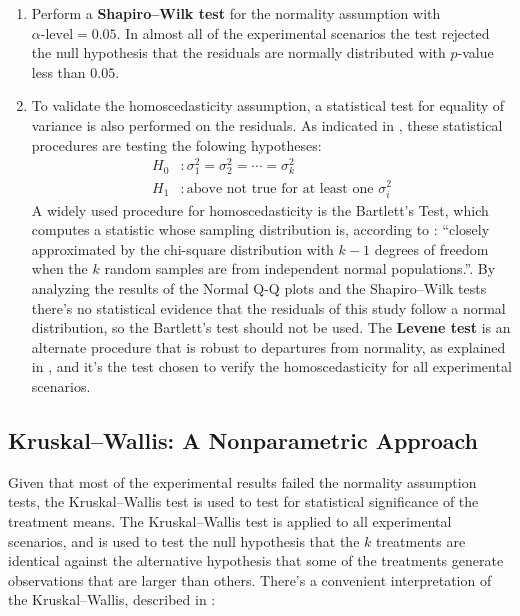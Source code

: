 \begin{enumerate}
    \item Perform a {\large\textbf{Shapiro–Wilk test}} for the normality assumption with $\alpha\text{-level} = 0.05$. In almost all of the experimental scenarios the test rejected the null hypothesis that the residuals are normally distributed with $p$-value less than $0.05$.

    \item To validate the homoscedasticity assumption, a statistical test for equality of variance is also performed on the residuals. As indicated in \cite{montgomery2017design}, these statistical procedures are testing the folowing hypotheses:
    \begin{align*}
        H_0 &: \sigma^2_1 =  \sigma^2_2 = \cdots =  \sigma^2_k \\
        H_1 &: \text{above not true for at least one } \sigma^2_i    
    \end{align*}
    A widely used procedure for homoscedasticity is the Bartlett's Test, which computes a statistic whose sampling distribution is, according to \cite{montgomery2017design}: ``closely approximated by the chi-square distribution with $k - 1$ degrees of freedom when the $k$ random samples are from independent normal populations.''. By analyzing the results of the Normal Q-Q plots and the Shapiro–Wilk tests there's no statistical evidence that the residuals of this study follow a normal distribution, so the Bartlett's test should not be used.
    The {\large\textbf{Levene test}} is an alternate procedure that is robust to departures from normality, as explained in \cite{brown1974robust}, and it's the test chosen to verify the homoscedasticity for all experimental scenarios.
    
\end{enumerate}

\subsection{Kruskal–Wallis: A Nonparametric Approach}

Given that most of the experimental results failed the normality assumption tests, the Kruskal–Wallis test is used to test for statistical significance of the treatment means. The Kruskal–Wallis test is applied to all experimental scenarios, and is used to test the null hypothesis that the $k$ treatments are identical against the alternative hypothesis that some of the treatments generate observations that are larger than others. There's a convenient interpretation of the Kruskal–Wallis, described in \cite{montgomery2017design}:

